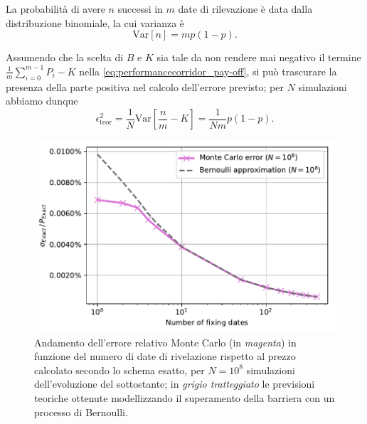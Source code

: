 La probabilità di avere $n$ successi in $m$ date di rilevazione è data dalla distribuzione binomiale, la cui varianza è
\begin{equation}
    \text{Var}[n] = mp(1-p).
    \label{eq:binomial_variance}
\end{equation}

Assumendo che la scelta di $B$ e $K$ sia tale da non rendere mai negativo il termine $\frac{1}{m} \sum_{i=0}^{m-1}{P_i} - K$ nella \eqref{eq:performancecorridor_pay-off}, si può trascurare la presenza della parte positiva nel calcolo dell'errore previsto; per $N$ simulazioni abbiamo dunque
\begin{equation}
    \epsilon^2_{\text{teor}} = \frac{1}{N} \text{Var}\left[\frac{n}{m} - K\right] = \frac{1}{Nm} p(1-p).
    \label{eq:error_theoretical_squared}
\end{equation}

\begin{figure}[t]
    \centering
    \includegraphics[scale=0.5]{graphs/OptionPriceVsM_ExactErrorVsM_N108.pdf}
    \caption[Confronto dell'errore relativo Monte Carlo in funzione del numero di date di rivelazione rispetto al prezzo calcolato secondo lo schema esatto con le previsioni teoriche del processo di Bernoulli.]{Andamento dell'errore relativo Monte Carlo (in \textit{magenta}) in funzione del numero di date di rivelazione rispetto al prezzo calcolato secondo lo schema esatto, per $N={10}^8$ simulazioni dell'evoluzione del sottostante; in \textit{grigio tratteggiato} le previsioni teoriche ottenute modellizzando il superamento della barriera con un processo di Bernoulli.}
    \label{fig:theoretical_vs_experimental_error}
\end{figure}

